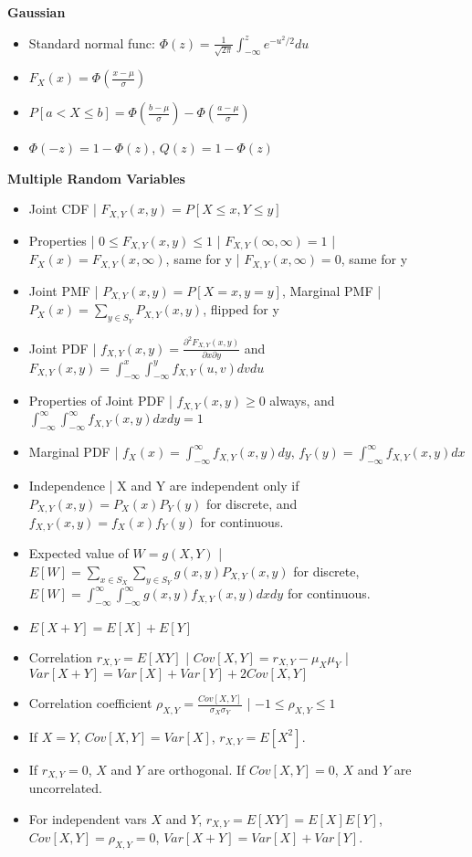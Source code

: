 \documentclass[8pt]{article}
\begin{document}
\textbf{Gaussian}
\begin{itemize}
    \item Standard normal func: $\Phi(z) = \frac{1}{\sqrt{2 \pi}} \int_{-\infty}^z e^{-u^2/2} du$
    \item $F_X(x) = \Phi\left(\frac{x - \mu}{\sigma}\right)$
    \item $P[a < X \leq b] = \Phi\left(\frac{b - \mu}{\sigma}\right) - \Phi\left(\frac{a - \mu}{\sigma}\right)$
    \item $\Phi(-z) = 1 - \Phi(z)$, $Q(z) = 1 - \Phi(z)$
\end{itemize}
\textbf{Multiple Random Variables}
\begin{itemize}
    \item Joint CDF | $F_{X,Y}(x,y) = P[X \leq x, Y \leq y]$
    \item Properties | $0 \leq F_{X,Y}(x, y) \leq 1$ | $F_{X,Y}(\infty, \infty) = 1$ | $F_X(x) = F_{X,Y}(x, \infty)$, same for y | $F_{X,Y}(x, \infty) = 0$, same for y
    \item Joint PMF | $P_{X,Y}(x, y) = P[X = x, y = y]$, Marginal PMF | $P_X(x) = \sum_{y \in S_Y} P_{X,Y}(x, y)$, flipped for y
    \item Joint PDF | $f_{X,Y}(x, y) = \frac{\partial^2 F_{X,Y}(x, y)}{\partial x \partial y}$ and $F_{X,Y}(x, y) = \int_{-\infty}^x \int_{-\infty}^y f_{X,Y}(u, v) dv du$
    \item Properties of Joint PDF | $f_{X,Y}(x, y) \geq 0$ always, and $\int_{-\infty}^\infty \int_{-\infty}^\infty f_{X,Y}(x, y) dxdy = 1$
    \item Marginal PDF | $f_X(x) = \int_{-\infty}^\infty f_{X,Y}(x, y)dy$, $f_Y(y) = \int_{-\infty}^\infty f_{X,Y}(x, y)dx$
    \item Independence | X and Y are independent only if $P_{X,Y}(x, y) = P_X(x) P_Y(y)$ for discrete, and $f_{X,Y}(x, y) = f_X(x)f_Y(y)$ for continuous.
    \item Expected value of $W = g(X, Y)$ | $E[W]= \sum_{x \in S_X} \sum_{y \in S_Y} g(x, y) P_{X,Y}(x, y)$ for discrete, $E[W] = \int_{-\infty}^\infty \int_{-\infty}^\infty g(x, y)f_{X,Y}(x, y)dxdy$ for continuous.
    \item $E[X + Y] = E[X] + E[Y]$
    \item Correlation $r_{X,Y} = E[XY]$ | $Cov[X, Y] = r_{X,Y} - \mu_X \mu_Y$ | $Var[X + Y] = Var[X] + Var[Y] + 2Cov[X, Y]$
    \item Correlation coefficient $\rho_{X,Y} = \frac{Cov[X, Y]}{\sigma_X \sigma_Y}$ | $-1 \leq \rho_{X,Y} \leq 1$
    \item If $X = Y$, $Cov[X, Y] = Var[X]$, $r_{X,Y} = E[X^2]$.
    \item If $r_{X,Y} = 0$, $X$ and $Y$ are orthogonal. If $Cov[X, Y] = 0$, $X$ and $Y$ are uncorrelated.
    \item For independent vars $X$ and $Y$, $r_{X,Y} = E[XY] = E[X]E[Y]$, $Cov[X, Y] = \rho_{X,Y} = 0$, $Var[X + Y] = Var[X] + Var[Y]$.
\end{itemize}
\end{document}
